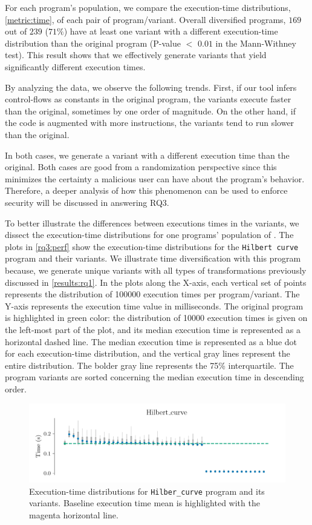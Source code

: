 For each program's population, we compare the execution-time distributions, \autoref{metric:time}, of each pair of program/variant.
Overall diversified programs, $169$ out of $239$ ($71\%$) have at least one variant with a different execution-time distribution than the original program (P-value $<$ $0.01$ in the Mann-Withney test). This result shows that we effectively generate variants that yield significantly different execution times.

By analyzing the data, we observe the following trends. First, if our tool infers control-flows as constants in the original program, the variants execute faster than the original, sometimes by one order of magnitude. On the other hand, if the code is augmented with more instructions, the variants tend to run slower than the original. 

In both cases, we generate a variant with a different execution time than the original. Both cases are good from a randomization perspective since this minimizes the certainty a malicious user can have about the program's behavior. Therefore, a deeper analysis of how this phenomenon can be used to enforce security will be discussed in answering RQ3.

To better illustrate the differences between executions times in the variants, we dissect the execution-time distributions for one programs' population of \corpusrosetta. The plots in \autoref{rq3:perf} show the execution-time distributions for the \texttt{Hilbert curve} program and their variants. 
We illustrate time diversification with this program because, we generate unique variants with all types of transformations previously discussed in \autoref{results:rq1}.
In the plots along the X-axis, each vertical set of points represents the distribution of 100000 execution times per program/variant. The Y-axis represents the execution time value in milliseconds. The original program is highlighted in green color: the distribution of 10000 execution times is given on the left-most part of the plot, and its median execution time is represented as a horizontal dashed line. The median execution time is represented as a blue dot for each execution-time distribution, and the vertical gray lines represent the entire distribution. The bolder gray line represents the 75\% interquartile. The program variants are sorted concerning the median execution time in descending order.

\begin{figure}[h]
    \centering
    \includegraphics[width=\linewidth]{plots/hilbert_curve.pdf}
    \caption{Execution-time distributions for \texttt{Hilber\_curve} program and its variants. Baseline execution time mean is highlighted with the magenta horizontal line. }
    \label{rq3:perf}
\end{figure}

